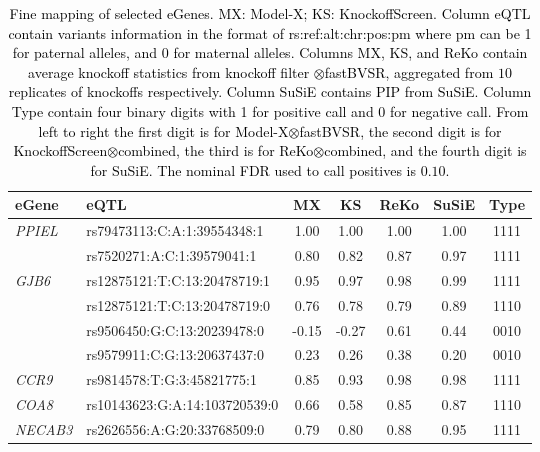 \documentclass[12pt,Times]{article}
\def\tcb{\textcolor{black}}
\begin{document}
\begin{table}[h]
\begin{center}
{%
\begin{tabular}{llccccc}
eGene &eQTL & MX & KS  & ReKo  & SuSiE & Type\\ 
\hline
\multirow{2}{*}{\emph{PPIEL}} 
&rs79473113:C:A:1:39554348:1 & 1.00 & 1.00 & 1.00 & 1.00 & 1111 \\
&rs7520271:A:C:1:39579041:1 & 0.80 & 0.82 & 0.87 & 0.97 & 1111 \\
\hline
\multirow{4}{*}{\emph{GJB6}}
&rs12875121:T:C:13:20478719:1 & 0.95 & 0.97 & 0.98 & 0.99 & 1111 \\
&rs12875121:T:C:13:20478719:0 & 0.76 & 0.78 & 0.79 & 0.89 & 1110 \\
&rs9506450:G:C:13:20239478:0 & -0.15 & -0.27 & 0.61 & 0.44 & 0010 \\
&rs9579911:C:G:13:20637437:0 & 0.23 & 0.26 & 0.38 & 0.20 &  0010 \\
\hline
\multirow{1}{*}{\emph{CCR9}}
&rs9814578:T:G:3:45821775:1 & 0.85 & 0.93 & 0.98 & 0.98 & 1111 \\
\hline
\multirow{1}{*}{\emph{COA8}}
&rs10143623:G:A:14:103720539:0 & 0.66 & 0.58 & 0.85 & 0.87 & 1110 \\ 
\hline
\multirow{1}{*}{\emph{NECAB3}}
&rs2626556:A:G:20:33768509:0&  0.79 & 0.80 & 0.88 & 0.95 & 1111\\
\hline
\end{tabular}
}
\end{center}
\vspace{-0.1in}
\caption{\tcb{Fine mapping of selected eGenes. MX: Model-X; KS: KnockoffScreen. Column eQTL contain variants  information in the format of rs:ref:alt:chr:pos:pm where pm can be 1 for paternal alleles, and 0 for maternal alleles. Columns MX, KS, and ReKo contain average knockoff statistics from knockoff filter \allowbreak$\otimes$fastBVSR, aggregated from $10$ replicates of knockoffs respectively. Column SuSiE contains PIP from SuSiE. Column Type contain four binary digits with 1 for positive call and 0 for negative call. From left to right the first digit is for Model-X\allowbreak$\otimes$fastBVSR, the second digit is for KnockoffScreen\allowbreak$\otimes$combined, the third is for ReKo\allowbreak$\otimes$combined, and the fourth digit is for SuSiE. The nominal FDR used to call positives is $0.10$.}}
\label{poe}
\vspace{-0.1in}
\end{table}%

\end{document}
